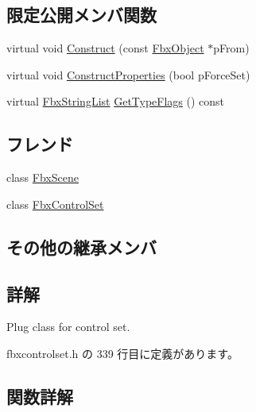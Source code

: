 \subsection*{限定公開メンバ関数}
\begin{DoxyCompactItemize}
\item 
virtual void \hyperlink{class_fbx_control_set_plug_a238ea564b568be5fadd03981570c2e47}{Construct} (const \hyperlink{class_fbx_object}{Fbx\+Object} $\ast$p\+From)
\item 
virtual void \hyperlink{class_fbx_control_set_plug_a9551bc59f788d2b0e44b7b8ba31188a6}{Construct\+Properties} (bool p\+Force\+Set)
\item 
virtual \hyperlink{class_fbx_string_list}{Fbx\+String\+List} \hyperlink{class_fbx_control_set_plug_a3111172be32f425f4d9b3bf281d2b4d2}{Get\+Type\+Flags} () const
\end{DoxyCompactItemize}
\subsection*{フレンド}
\begin{DoxyCompactItemize}
\item 
class \hyperlink{class_fbx_control_set_plug_abcc807c3523609e1c734764de626facc}{Fbx\+Scene}
\item 
class \hyperlink{class_fbx_control_set_plug_abb7258e30f1cd7963b2a91006c383c19}{Fbx\+Control\+Set}
\end{DoxyCompactItemize}
\subsection*{その他の継承メンバ}


\subsection{詳解}
Plug class for control set. 

 fbxcontrolset.\+h の 339 行目に定義があります。



\subsection{関数詳解}
\mbox{\label{class_fbx_control_set_plug_a238ea564b568be5fadd03981570c2e47}} 
